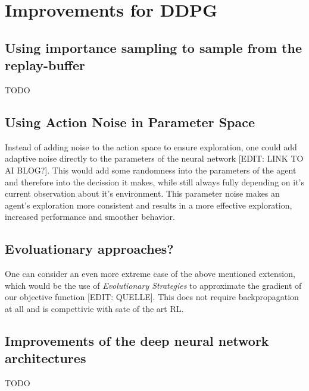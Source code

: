 \section{Improvements for DDPG}
\subsection{Using importance sampling to sample from the replay-buffer}
TODO
\subsection{Using Action Noise in Parameter Space}
Instead of adding noise to the action space to ensure exploration, one could add adaptive noise directly to the parameters of the neural network [EDIT: LINK TO AI BLOG?]. This would add some randomness into the parameters of the agent and therefore into the decission it makes, while still always fully depending on it's current observation about it's environment. This parameter noise makes an agent's exploration more consistent and results in a more effective exploration, increased performance and smoother behavior. 
\subsection{Evoluationary approaches?}
One can consider an even more extreme case of the above mentioned extension, which would be the use of \textit{Evolutionary Strategies} to approximate the gradient of our objective function [EDIT: QUELLE]. This does not require backpropagation at all and is compettivie with sate of the art RL.
\subsection{Improvements of the deep neural network architectures}
TODO
\label{sec:1}

